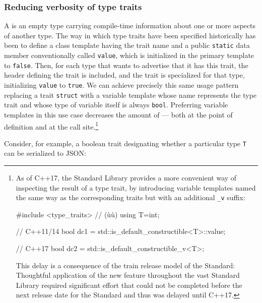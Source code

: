 \subsubsection[Reducing verbosity of type traits]{Reducing verbosity of type traits}\label{reducing-verbosity-of-type-traits}

A  is an empty type carrying compile-time information
about one or more aspects of another type. The way in which type traits
have been specified historically has been to define a class template
having the trait name and a public \lstinline!static! 
data member conventionally called \lstinline!value!, which is
initialized in the primary template to \lstinline!false!. Then, for each
type that wants to advertise that it has this trait, the header defining
the trait is included, and the trait is specialized for that type,
initializing \lstinline!value! to \lstinline!true!. We can achieve precisely
this same usage pattern replacing a trait \lstinline!struct! with a
variable template whose name represents the type trait and whose type of
variable itself is always \lstinline!bool!. Preferring variable templates
in this use case decreases the amount of  ---
both at the point of definition and at the call
site.{\cprotect\footnote{As of C++17, the Standard Library provides a
more convenient way of inspecting the result of a type trait, by
introducing variable templates named the same way as the corresponding
traits but with an additional \lstinline!_v! suffix:

\begin{emcppshiddenlisting}[emcppsbatch=e5,emcppsstandards={c++17},style=footcode]
#include <type_traits>  // (ù{}ù)
using T=int;
\end{emcppshiddenlisting}
\begin{emcppslisting}[emcppsbatch=e5,emcppsstandards={c++14},style=footcode]
// C++11/14
bool dc1 = std::is_default_constructible<T>::value;

// C++17
bool dc2 = std::is_default_constructible_v<T>;
\end{emcppslisting}
This delay is a consequence of the train release model of the Standard: Thoughtful application of the new feature throughout the vast Standard Library required significant effort that could not be completed before the next release date for the Standard and thus was delayed until C++17.
      }}

Consider, for example, a boolean trait designating whether a particular
type \lstinline!T! can be serialized to JSON:

